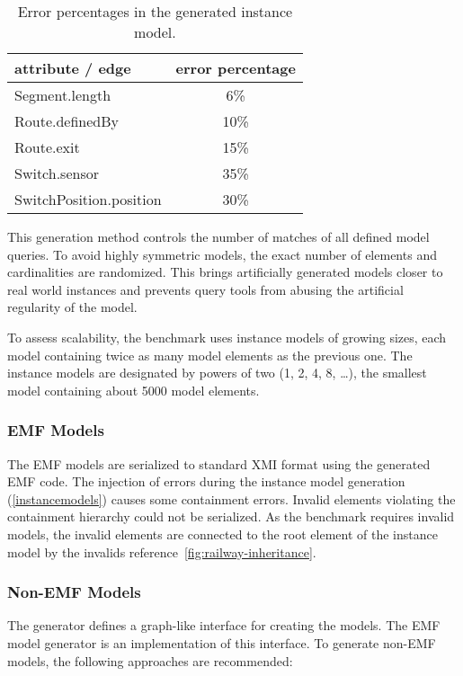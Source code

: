 \documentclass[submission,copyright,creativecommons]{eptcs}
\newcommand{\figref}[1]{\autoref{fig:#1}}
\begin{document}
\begin{table}
\centering
\begin{tabular}{ | l | c | }
\hline
\bf attribute / edge & \bf error percentage \\\hline
\sf Segment.length          & 6\%  \\\hline
\sf Route.definedBy         & 10\% \\\hline
\sf Route.exit              & 15\% \\\hline
\sf Switch.sensor           & 35\% \\\hline
\sf SwitchPosition.position & 30\% \\\hline
\end{tabular}
\caption{Error percentages in the generated instance model.}
\label{tab:errorpercentages}
\end{table}

This generation method controls the number of matches of all defined model queries. To avoid highly symmetric models, the exact number of elements and cardinalities are randomized. This brings artificially generated models closer to real world instances and prevents query tools from abusing the artificial regularity of the model. 

To assess scalability, the benchmark uses instance models of growing sizes, each model containing twice as many model elements as the previous one. The instance models are designated by powers of two (1, 2, 4, 8, \ldots), the smallest model containing about 5000 model elements. 

\subsubsection{EMF Models}
\label{emf-models}

The EMF models are serialized to standard XMI format using the generated EMF code. The injection of errors during the instance model generation (\autoref{instancemodels}) causes some containment errors. Invalid elements violating the containment hierarchy could not be serialized. As the benchmark requires invalid models, the invalid elements are connected to the root element of the instance model by the \textsf{invalids} reference~\figref{railway-inheritance}.

\subsubsection{Non-EMF Models}

The generator defines a graph-like interface for creating the models. The EMF model generator is an implementation of this interface. To generate non-EMF models, the following approaches are recommended:
\end{document}
